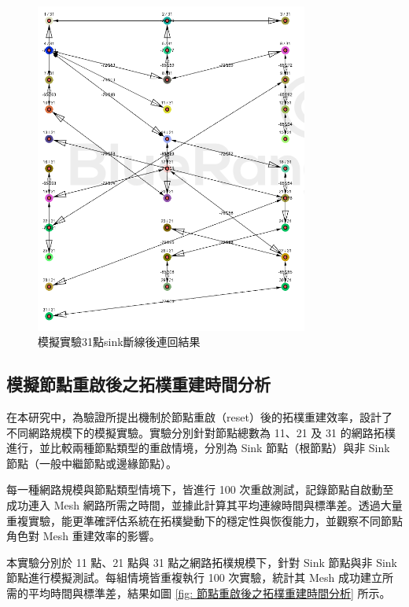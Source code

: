 \begin{ZhChapter}
\begin{figure}[H]
    \centering
    \includegraphics[width = 0.8\textwidth]{image/模擬實驗31點sink斷線後連回.png}
    \caption{模擬實驗31點sink斷線後連回結果}
    \label{fig: 模擬實驗31點sink斷線後連回}
\end{figure}


\subsection{模擬節點重啟後之拓樸重建時間分析}
在本研究中，為驗證所提出機制於節點重啟（reset）後的拓樸重建效率，設計了不同網路規模下的模擬實驗。實驗分別針對節點總數為 11、21 及 31 的網路拓樸進行，並比較兩種節點類型的重啟情境，分別為 Sink 節點（根節點）與非 Sink 節點（一般中繼節點或邊緣節點）。

每一種網路規模與節點類型情境下，皆進行 100 次重啟測試，記錄節點自啟動至成功連入 Mesh 網路所需之時間，並據此計算其平均連線時間與標準差。透過大量重複實驗，能更準確評估系統在拓樸變動下的穩定性與恢復能力，並觀察不同節點角色對 Mesh 重建效率的影響。

本實驗分別於 11 點、21 點與 31 點之網路拓樸規模下，針對 Sink 節點與非 Sink 節點進行模擬測試。每組情境皆重複執行 100 次實驗，統計其 Mesh 成功建立所需的平均時間與標準差，結果如圖 \ref{fig: 節點重啟後之拓樸重建時間分析} 所示。


\end{ZhChapter}
